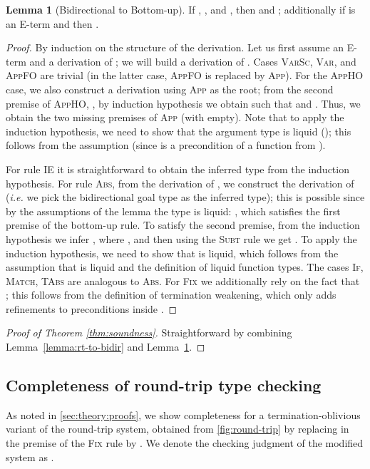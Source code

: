 \documentclass[10pt,preprint]{sigplanconf-pldi16}
\makeatletter
\theoremstyle{definition}
\newtheorem{lemma}{Lemma}
\newcommand{\ie}{\textit{i.e.}\@\xspace}
\makeatother
\begin{document}
\begin{lemma}[Bidirectional to Bottom-up]\label{lemma:bidir-to-bu}
If , , and , then  and ;
additionally if  is an E-term and  then .
\end{lemma}
\begin{proof}
By induction on the structure of the derivation.
Let us first assume an E-term  and a derivation of ;
we will build a derivation of .
Cases \textsc{VarSc}, \textsc{Var}, and \textsc{AppFO} are trivial
(in the latter case, \textsc{AppFO} is replaced by \textsc{App}).
For the \textsc{AppHO} case, we also construct a derivation using \textsc{App} as the root;
from the second premise of \textsc{AppHO}, , 
by induction hypothesis we obtain  such that  and .
Thus, we obtain the two missing premises of \textsc{App} (with  empty).
Note that to apply the induction hypothesis, we need to show that the argument type  is liquid ();
this follows from the assumption  (since  is a precondition of a function from ).

For rule \textsc{IE} it is straightforward to obtain the inferred type  from the induction hypothesis.
For rule \textsc{Abs}, from the derivation of ,
we construct the derivation of  (\ie we pick the bidirectional goal type as the inferred type);
this is possible since by the assumptions of the lemma the type is liquid: ,
which satisfies the first premise of the bottom-up rule.
To satisfy the second premise,
from the induction hypothesis we infer , where ,
and then using the \textsc{Subt} rule we get .
To apply the induction hypothesis, we need to show that  is liquid,
which follows from the assumption that  is liquid and the definition of liquid function types.
The cases \textsc{If}, \textsc{Match}, \textsc{TAbs} are analogous to \textsc{Abs}.
For \textsc{Fix} we additionally rely on the fact that ;
this follows from the definition of termination weakening, 
which only adds refinements to preconditions inside .
\end{proof}

\begin{proof}[Proof of Theorem \ref{thm:soundness}]
Straightforward by combining Lemma~\ref{lemma:rt-to-bidir} and Lemma~\ref{lemma:bidir-to-bu}.
\end{proof}

\subsection{Completeness of round-trip type checking}

As noted in \autoref{sec:theory:proofs},
we show completeness for a termination-oblivious variant of the round-trip system,
obtained from \autoref{fig:round-trip} by replacing  in the premise of the \textsc{Fix} rule by .
We denote the checking judgment of the modified system as .
\end{document}
